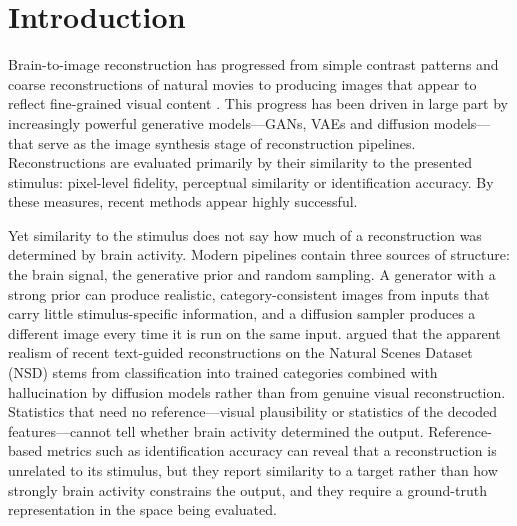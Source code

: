 \documentclass[11pt,a4paper]{article}
\begin{document}
\section{Introduction}

Brain-to-image reconstruction has progressed from simple contrast patterns and
coarse reconstructions of natural movies \citep{miyawaki2008,nishimoto2011} to
producing images that appear to reflect fine-grained visual content
\citep{shen2019,ozcelik2023,scotti2023,scotti2024}. This progress has been
driven in large part by increasingly powerful generative models---GANs, VAEs and
diffusion models---that serve as the image synthesis stage of reconstruction
pipelines. Reconstructions are evaluated primarily by their similarity to the
presented stimulus: pixel-level fidelity, perceptual similarity or
identification accuracy. By these measures, recent methods appear highly
successful.

Yet similarity to the stimulus does not say how much of a reconstruction was
determined by brain activity. Modern pipelines contain three sources of
structure: the brain signal, the generative prior and random sampling. A
generator with a strong prior can produce realistic, category-consistent images
from inputs that carry little stimulus-specific information, and a diffusion
sampler produces a different image every time it is run on the same input.
\citet{shirakawa2025} argued that the apparent realism of recent text-guided
reconstructions on the Natural Scenes Dataset (NSD) \citep{allen2022} stems from
classification into trained categories combined with hallucination by diffusion
models rather than from genuine visual reconstruction. Statistics that need no
reference---visual plausibility or
statistics of the decoded features---cannot tell whether brain activity
determined the output. Reference-based metrics such as identification accuracy
can reveal that a reconstruction is unrelated to its stimulus, but they report
similarity to a target rather than how strongly brain activity constrains the
output, and they require a ground-truth representation in the space being
evaluated.
\end{document}
